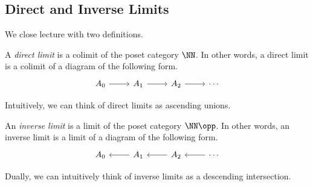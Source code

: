\subsection{Direct and Inverse Limits}
We close lecture with two definitions.
\begin{definition}
	A \textit{direct limit} is a colimit of the poset category $\NN$. In other words, a direct limit is a colimit of a diagram of the following form.
	\[\begin{tikzcd}
		{A_0} & {A_1} & {A_2} & \cdots
		\arrow[from=1-1, to=1-2]
		\arrow[from=1-2, to=1-3]
		\arrow[from=1-3, to=1-4]
	\end{tikzcd}\]
\end{definition}
Intuitively, we can think of direct limits as ascending unions.
\begin{definition}
	An \textit{inverse limit} is a limit of the poset category $\NN\opp$. In other words, an inverse limit is a limit of a diagram of the following form.
	\[\begin{tikzcd}
		{A_0} & {A_1} & {A_2} & \cdots
		\arrow[from=1-2, to=1-1]
		\arrow[from=1-3, to=1-2]
		\arrow[from=1-4, to=1-3]
	\end{tikzcd}\]
\end{definition}
Dually, we can intuitively think of inverse limits as a descending intersection.